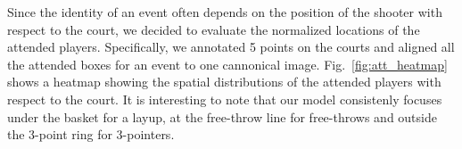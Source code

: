 Since the identity of an event often depends on the position of the
shooter with respect to the court, we decided to evaluate the
normalized locations of the attended players.
Specifically, we annotated 5 points on the courts and
aligned all the attended boxes for an event to one cannonical image. 
Fig.~\ref{fig:att_heatmap} shows a heatmap  showing the spatial distributions
of the attended players with respect to the court. It is interesting to note that
our model consistenly focuses under the basket for a layup, at the free-throw
line for free-throws and outside the 3-point ring for 3-pointers.



